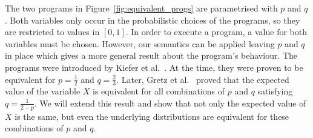 The two programs in Figure~\ref{fig:equivalent_progs} are parametrised with $p$ and $q$.
Both variables only occur in the probabilistic choices of the programs, so they are restricted to values in $[0, 1]$.
In order to execute a program, a value for both variables must be chosen.
However, our semantics can be applied leaving $p$ and $q$ in place which gives a more general result about the program's behaviour.
The programs were introduced by Kiefer et al.~\cite{kiefer:equivalent_programs}.
At the time, they were proven to be equivalent for $p = \frac{1}{2}$ and $q = \frac{2}{3}$.
Later, Gretz et al.~\cite{gretz:prinsys} proved that the expected value of the variable $X$ is equivalent for all combinations of $p$ and $q$ satisfying $q = \frac{1}{2-p}$.
We will extend this result and show that not only the expected value of $X$ is the same, but even the underlying distributions are equivalent for these combinations of $p$ and $q$.

